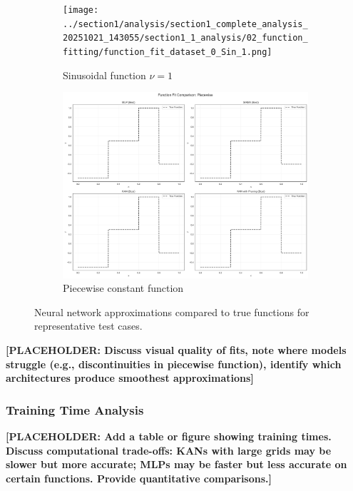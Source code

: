 \documentclass[11pt,a4paper]{article}
\begin{document}
\begin{figure}[htbp]
\centering
\begin{subfigure}{0.48\textwidth}
\texttt{[image: ../section1/analysis/section1\_complete\_analysis\_20251021\_143055/section1\_1\_analysis/02\_function\_fitting/function\_fit\_dataset\_0\_Sin\_1.png]}
\caption{Sinusoidal function $\nu=1$}
\end{subfigure}
\hfill
\begin{subfigure}{0.48\textwidth}
\includegraphics[width=\textwidth]{../section1/analysis/section1_complete_analysis_20251021_143055/section1_1_analysis/02_function_fitting/function_fit_dataset_5_Piecewise.png}
\caption{Piecewise constant function}
\end{subfigure}
\caption{Neural network approximations compared to true functions for representative test cases.}
\label{fig:s11_fits}
\end{figure}

\textbf{[PLACEHOLDER: Discuss visual quality of fits, note where models struggle (e.g., discontinuities in piecewise function), identify which architectures produce smoothest approximations]}

\subsubsection{Training Time Analysis}

\textbf{[PLACEHOLDER: Add a table or figure showing training times. Discuss computational trade-offs: KANs with large grids may be slower but more accurate; MLPs may be faster but less accurate on certain functions. Provide quantitative comparisons.]}
\end{document}
